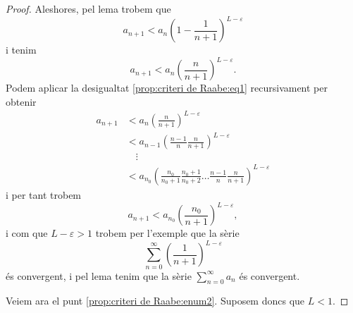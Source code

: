 \documentclass[../../Main.tex]{subfiles}
\begin{document}
\begin{proposition}
\begin{proof}
			Aleshores, pel lema  trobem que
			\[a_{n+1}<a_{n}\left(1-\frac{1}{n+1}\right)^{L-\varepsilon}\]
			i tenim
			\begin{equation}
				\label{prop:criteri de Raabe:eq1}
				a_{n+1}<a_{n}\left(\frac{n}{n+1}\right)^{L-\varepsilon}.
			\end{equation}
			Podem aplicar la desigualtat \eqref{prop:criteri de Raabe:eq1} recursivament per obtenir
			\begin{align*}
				a_{n+1}&<a_{n}\left(\frac{n}{n+1}\right)^{L-\varepsilon}\\
				&<a_{n-1}\left(\frac{n-1}{n}\frac{n}{n+1}\right)^{L-\varepsilon}\\
				&\quad\vdots\\
				&<a_{n_{0}}\left(\frac{n_{0}}{n_{0}+1}\frac{n_{0}+1}{n_{0}+2}\dots\frac{n-1}{n}\frac{n}{n+1}\right)^{L-\varepsilon}
			\end{align*}
			i per tant trobem
			\[a_{n+1}<a_{n_{0}}\left(\frac{n_{0}}{n+1}\right)^{L-\varepsilon},\]
			i com que \(L-\varepsilon>1\) trobem per l'exemple  que la sèrie
			\[\sum_{n=0}^{\infty}\left(\frac{1}{n+1}\right)^{L-\varepsilon}\]
			és convergent, i pel lema  tenim que la sèrie \(\sum_{n=0}^{\infty}a_{n}\) és convergent.
			
			Veiem ara el punt \eqref{prop:criteri de Raabe:enum2}. Suposem doncs que \(L<1\).
		\end{proof}
	\end{proposition}
\end{document}
